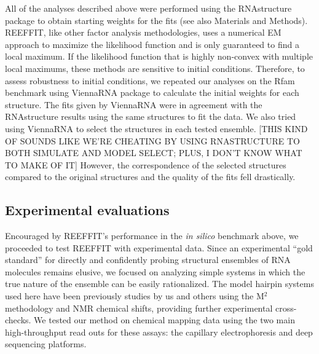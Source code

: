 \documentclass[12pt]{article}
\begin{document}
All of the analyses described above were performed using the RNAstructure package to obtain starting weights for the fits (see also Materials and Methods). 
REEFFIT, like other factor analysis methodologies, uses a numerical EM approach to maximize the likelihood function and is only guaranteed to find a local maximum. If the likelihood function that is highly non-convex with multiple local maximums, these methods are sensitive to initial conditions.
Therefore, to assess robustness to initial conditions, we repeated our analyses on the Rfam benchmark using ViennaRNA package to calculate the initial weights for each structure.
The fits given by ViennaRNA were in agreement with the RNAstructure results using the same structures to fit the data.
We also tried using ViennaRNA to select the structures in each tested ensemble. 
[THIS KIND OF SOUNDS LIKE WE'RE CHEATING BY USING RNASTRUCTURE TO BOTH SIMULATE AND MODEL SELECT; PLUS, I DON'T KNOW WHAT TO MAKE OF IT] However, the correspondence of the selected structures compared to the original structures and the quality of the fits fell drastically.  



\subsection{Experimental evaluations}

Encouraged by REEFFIT's performance in the \textit{in silico} benchmark above, we proceeded to test REEFFIT with experimental data. 
Since an experimental ``gold standard'' for directly and confidently probing structural ensembles of RNA molecules remains elusive, we focused on analyzing simple systems in which the true nature of the ensemble can be easily rationalized.
The model hairpin systems used here have been previously studies by us and others using the M$^2$ methodology and NMR chemical shifts, providing further experimental cross-checks.
We tested our method on chemical mapping data using the two main high-throughput read outs for these assays: the capillary electrophoresis and deep sequencing platforms. 
\end{document}
